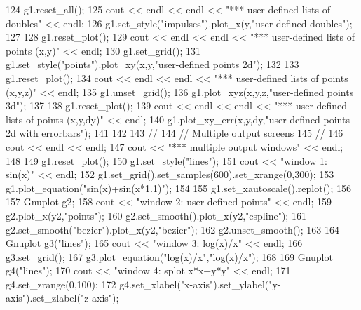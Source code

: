 \begin{DoxyCode}
124         g1.reset\_all();
125         cout << endl << endl << \textcolor{stringliteral}{"*** user-defined lists of doubles"} << endl;
126         g1.set\_style(\textcolor{stringliteral}{"impulses"}).plot\_x(y,\textcolor{stringliteral}{"user-defined doubles"});
127 
128         g1.reset\_plot();
129         cout << endl << endl << \textcolor{stringliteral}{"*** user-defined lists of points (x,y)"} << endl;
130         g1.set\_grid();
131         g1.set\_style(\textcolor{stringliteral}{"points"}).plot\_xy(x,y,\textcolor{stringliteral}{"user-defined points 2d"});
132 
133         g1.reset\_plot();
134         cout << endl << endl << \textcolor{stringliteral}{"*** user-defined lists of points (x,y,z)"} << endl;
135         g1.unset\_grid();
136         g1.plot\_xyz(x,y,z,\textcolor{stringliteral}{"user-defined points 3d"});
137 
138         g1.reset\_plot();
139         cout << endl << endl << \textcolor{stringliteral}{"*** user-defined lists of points (x,y,dy)"} << endl;
140         g1.plot\_xy\_err(x,y,dy,\textcolor{stringliteral}{"user-defined points 2d with errorbars"});
141 
142 
143         \textcolor{comment}{//}
144         \textcolor{comment}{// Multiple output screens}
145         \textcolor{comment}{//}
146         cout << endl << endl;
147         cout << \textcolor{stringliteral}{"*** multiple output windows"} << endl;
148 
149         g1.reset\_plot();
150         g1.set\_style(\textcolor{stringliteral}{"lines"});
151         cout << \textcolor{stringliteral}{"window 1: sin(x)"} << endl;
152         g1.set\_grid().set\_samples(600).set\_xrange(0,300);
153         g1.plot\_equation(\textcolor{stringliteral}{"sin(x)+sin(x*1.1)"});
154 
155         g1.set\_xautoscale().replot();
156 
157         Gnuplot g2;
158         cout << \textcolor{stringliteral}{"window 2: user defined points"} << endl;
159         g2.plot_x(y2,\textcolor{stringliteral}{"points"});
160         g2.set_smooth().plot_x(y2,\textcolor{stringliteral}{"cspline"});
161         g2.set_smooth(\textcolor{stringliteral}{"bezier"}).plot_x(y2,\textcolor{stringliteral}{"bezier"});
162         g2.unset_smooth();
163 
164         Gnuplot g3(\textcolor{stringliteral}{"lines"});
165         cout << \textcolor{stringliteral}{"window 3: log(x)/x"} << endl;
166         g3.set\_grid();
167         g3.plot\_equation(\textcolor{stringliteral}{"log(x)/x"},\textcolor{stringliteral}{"log(x)/x"});
168 
169         Gnuplot g4(\textcolor{stringliteral}{"lines"});
170         cout << \textcolor{stringliteral}{"window 4: splot x*x+y*y"} << endl;
171         g4.set\_zrange(0,100);
172         g4.set\_xlabel(\textcolor{stringliteral}{"x-axis"}).set\_ylabel(\textcolor{stringliteral}{"y-axis"}).set\_zlabel(\textcolor{stringliteral}{"z-axis"});

\end{DoxyCode}

